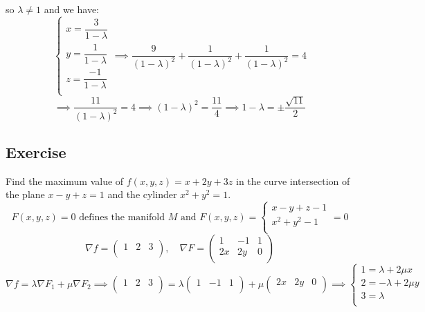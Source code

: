 \documentclass[11pt]{article}
\begin{document}
so $\lambda \neq 1$ and we have:
\[
\begin{cases}
    x = \dfrac{3}{1 - \lambda} \\
    y = \dfrac{1}{1 - \lambda} \\
    z = \dfrac{-1}{1 - \lambda} \\
\end{cases} \implies \frac{9}{(1 - \lambda)^2} + \frac{1}{(1 - \lambda)^2} + \frac{1}{(1 - \lambda)^2} = 4
\]
\[
\implies \frac{11}{(1 - \lambda)^2} = 4 \implies (1 - \lambda)^2 = \frac{11}{4} \implies 1 - \lambda = \pm \frac{\sqrt{11}}{2}
\]

\subsection*{Exercise}
Find the maximum value of $f(x,y,z) = x + 2y + 3z$ in the curve intersection of the plane $x - y + z = 1$ and the cylinder $x^2 + y^2 = 1$.
\[
F(x,y,z) = 0 \text{ defines the manifold } M \text{ and } F(x,y,z) = \begin{cases}
    x - y + z - 1 \\
    x^2 + y^2 - 1 \\
\end{cases} = 0
\]
\[
\nabla f = \begin{pmatrix}
    1 & 2 & 3 \\
\end{pmatrix}, \quad \nabla F = \begin{pmatrix}
    1 & -1 & 1 \\
    2x & 2y & 0 \\
\end{pmatrix}
\]
\[
\nabla f = \lambda \nabla F_1 + \mu \nabla F_2 \implies \begin{pmatrix}
    1 & 2 & 3 \\
\end{pmatrix} = \lambda \begin{pmatrix}
        1 & -1 & 1 \\
    \end{pmatrix} + \mu \begin{pmatrix}
        2x & 2y & 0 \\
    \end{pmatrix} \implies \begin{cases}
        1 = \lambda + 2\mu x \\
        2 = -\lambda + 2\mu y \\
        3 = \lambda \\
    \end{cases}
\]
\end{document}
